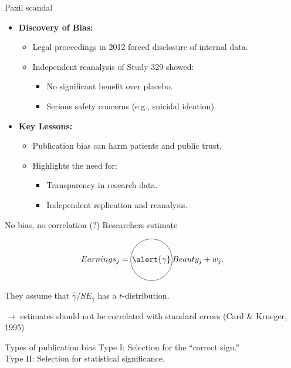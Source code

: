 \documentclass{beamer} %
\begin{document}
\begin{frame}{Paxil scandal}
    \begin{itemize}
        \item \textbf{Discovery of Bias:}
        \begin{itemize}
            \item Legal proceedings in 2012 forced disclosure of internal data.
            \item Independent reanalysis of Study 329 showed:
            \begin{itemize}
                \item No significant benefit over placebo.
                \item Serious safety concerns (e.g., suicidal ideation).
            \end{itemize}
        \end{itemize}
				
				\bigskip
        \item \textbf{Key Lessons:}
        \begin{itemize}
            \item Publication bias can harm patients and public trust.
            \item Highlights the need for:
            \begin{itemize}
                \item Transparency in research data.
                \item Independent replication and reanalysis.
            \end{itemize}
        \end{itemize}
    \end{itemize}
\end{frame}

\begin{frame}{No bias, no correlation (?)}
Researchers estimate

   \begin{equation*}
    Earnings_j = \tikz[baseline={(E.base)}]{\node[draw,circle,inner sep=1pt] (E) {$\alert{\gamma}$};} Beauty_j + w_j.
    \end{equation*}
		
\smallskip

They assume that $\widehat{\gamma}/SE_{\widehat{\gamma}}$ has a $t$-distribution. 

\smallskip

$\rightarrow$ \alert{estimates should not be correlated with standard errors} (Card \& Krueger, 1995)

\bigskip

\begin{block}{Types of publication bias}
Type I: Selection for the ``correct sign.'' \\
Type II: Selection for statistical significance.
\end{block}

\end{frame}
\end{document}
